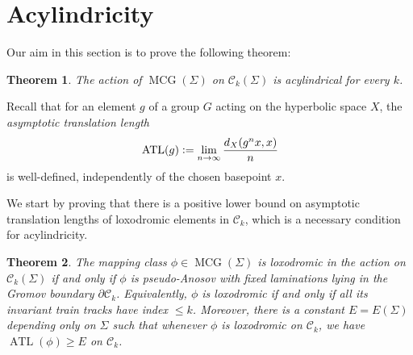 \documentclass[11pt]{article}
\newtheorem{thm}{Theorem}[section]
\theoremstyle{remark}
\def\C{{\mathcal C}}
\def\MCG{\operatorname{MCG}}
\newcommand{\ATL}{\operatorname{ATL}}
\begin{document}
\section{Acylindricity}

Our aim in this section is to prove the following theorem:
\begin{thm}
  \label{allacyl}
  The action of $\MCG(\Sigma)$ on $\C_k(\Sigma)$ is acylindrical for every $k$.
\end{thm}



Recall that for an element $g$ of a group $G$ acting on the hyperbolic space
$X$, the \emph{asymptotic translation length}
\[
  \ATL(g)\vcentcolon=\lim_{n\to \infty} \frac{d_X(g^nx, x)}{n}
\]
is well-defined, independently of the chosen basepoint $x$.

We start by proving that there is a positive lower bound on asymptotic
translation lengths of loxodromic elements in $\C_k$, which is a necessary condition for acylindricity.

\begin{thm}
  \label{loxclassification}
  The mapping class $\phi \in \MCG(\Sigma)$ is loxodromic in the action on $\C_k(\Sigma)$
  if and only if $\phi$ is pseudo-Anosov with fixed laminations lying in
  the Gromov boundary $\partial \C_k$. Equivalently, $\phi$ is loxodromic if and
  only if all its invariant train tracks have index $\leq k$.
  Moreover, there is a constant $E=E(\Sigma)$ depending
  only on $\Sigma$ such that whenever $\phi$ is loxodromic on $\C_k$, we have $\ATL(\phi)\geq E$ on $\C_k$.
\end{thm}
\end{document}
